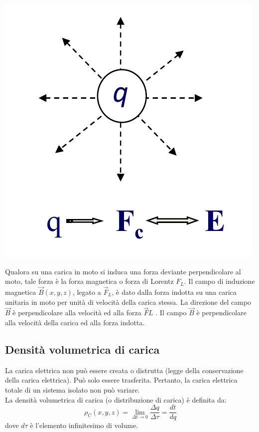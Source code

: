 \documentclass{article}
\begin{document}
\begin{center}
    \includegraphics[scale=0.27]{Image/Forza elettrostatica.png}
\end{center}
Qualora su una carica in moto si induca una forza
deviante perpendicolare al moto, tale forza è la
forza magnetica o forza di Lorentz 
$F_L$. Il campo
di induzione magnetica $\vec B(x,y,z)$, legato a $\vec F_L$, è
dato dalla forza indotta su una carica unitaria in
moto per unità di velocità della carica stessa. La
direzione del campo $\vec B$ è perpendicolare alla
velocità ed alla forza $\vec FL$ . Il campo $\vec B$ è
perpendicolare alla velocità della carica ed alla
forza indotta.

\subsection{Densità volumetrica di carica}
La carica elettrica non può essere creata o distrutta (legge della
conservazione della carica elettrica). Può solo essere trasferita. Pertanto, la
carica elettrica totale di un sistema isolato non può variare.\\
La densità volumetrica di carica (o distribuzione di carica) è definita da:
\[
    \rho_C (x,y,z) = \lim_{\Delta t \rightarrow 0} \frac{\Delta q}{\Delta \tau} = \frac{dt}{dq}  
\]
dove $d \tau$ è l'elemento infinitesimo di volume.
\end{document}
